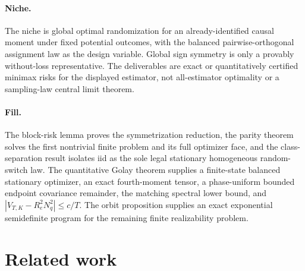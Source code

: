 \documentclass{article}
\begin{document}
\paragraph{Niche.} The niche is global optimal randomization for an already-identified causal moment under fixed potential outcomes, with the balanced pairwise-orthogonal assignment law as the design variable. Global sign symmetry is only a provably without-loss representative. The deliverables are exact or quantitatively certified minimax risks for the displayed estimator, not all-estimator optimality or a sampling-law central limit theorem.

\paragraph{Fill.} The block-risk lemma proves the symmetrization reduction, the parity theorem solves the first nontrivial finite problem and its full optimizer face, and the class-separation result isolates iid as the sole legal stationary homogeneous random-switch law. The quantitative Golay theorem supplies a finite-state balanced stationary optimizer, an exact fourth-moment tensor, a phase-uniform bounded endpoint covariance remainder, the matching spectral lower bound, and \(|V_{T,K}-R_e^2N_q^2|\le c/T\). The orbit proposition supplies an exact exponential semidefinite program for the remaining finite realizability problem.

\section{Related work}
\end{document}
